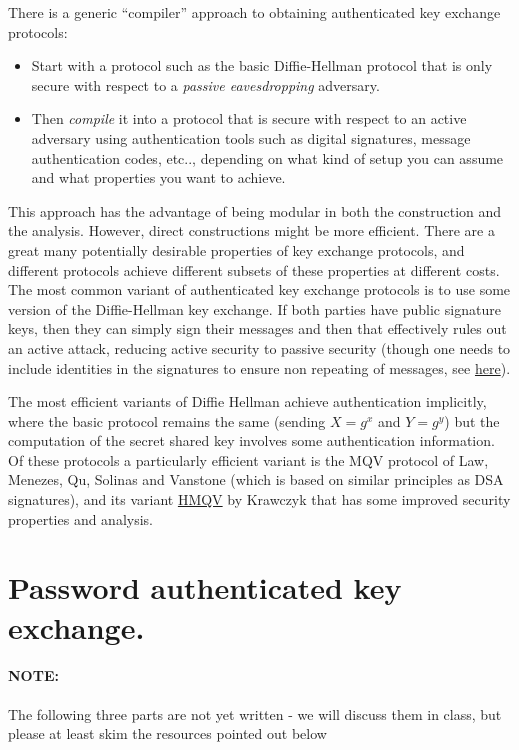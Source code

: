 There is a generic ``compiler'' approach to obtaining authenticated key
exchange protocols:

\begin{itemize}
\item
  Start with a protocol such as the basic Diffie-Hellman protocol that
  is only secure with respect to a \emph{passive eavesdropping}
  adversary.
\item
  Then \emph{compile} it into a protocol that is secure with respect to
  an active adversary using authentication tools such as digital
  signatures, message authentication codes, etc.., depending on what
  kind of setup you can assume and what properties you want to achieve.
\end{itemize}

This approach has the advantage of being modular in both the
construction and the analysis. However, direct constructions might be
more efficient. There are a great many potentially desirable properties
of key exchange protocols, and different protocols achieve different
subsets of these properties at different costs. The most common variant
of authenticated key exchange protocols is to use some version of the
Diffie-Hellman key exchange. If both parties have public signature keys,
then they can simply sign their messages and then that effectively rules
out an active attack, reducing active security to passive security
(though one needs to include identities in the signatures to ensure non
repeating of messages, see
\href{http://link.springer.com/article/10.1007\%2FBF00124891}{here}).

The most efficient variants of Diffie Hellman achieve authentication
implicitly, where the basic protocol remains the same (sending \(X=g^x\)
and \(Y=g^y\)) but the computation of the secret shared key involves
some authentication information. Of these protocols a particularly
efficient variant is the MQV protocol of Law, Menezes, Qu, Solinas and
Vanstone (which is based on similar principles as DSA signatures), and
its variant \href{https://eprint.iacr.org/2005/176.pdf}{HMQV} by
Krawczyk that has some improved security properties and analysis.

\section{Password authenticated key
exchange.}\label{12-Password-authenticated}

\paragraph{NOTE:} The following three parts are not yet written - we
will discuss them in class, but please at least skim the resources
pointed out below

